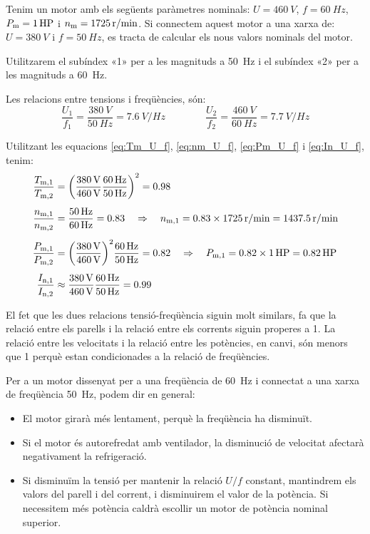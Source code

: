 \begin{exemple}[\MotorVarParamTensFreq{}]
	\addcontentsxms{\MotorVarParamTensFreq}
	Tenim un motor amb els següents paràmetres nominals: $U=\qty{460}{V}$, $f=\qty{60}{Hz}$,  $P_\mathrm{m}=\qty{1}{HP}$ i $n_\mathrm{m}=\qty{1725}{r/min}$. Si connectem aquest motor a una xarxa de: $U=\qty{380}{V}$ i $f=\qty{50}{Hz}$, es tracta de calcular els nous valors nominals del motor.
	
	Utilitzarem el subíndex «1» per a les magnituds  a \qty{50}{Hz} i el  subíndex «2» per a les magnituds a \qty{60}{Hz}.
	
	Les relacions entre tensions i freqüències,  són:
	\[
		\frac{U_1}{f_1} = \frac{\qty{380}{V}}{\qty{50}{Hz}} = \qty{7,6}{V/Hz} \qquad \qquad
		\frac{U_2}{f_2} = \frac{\qty{460}{V}}{\qty{60}{Hz}} = \qty{7,7}{V/Hz} 
	\]

	Utilitzant les equacions \eqref{eq:Tm_U_f},  \eqref{eq:nm_U_f}, \eqref{eq:Pm_U_f} i \eqref{eq:In_U_f},  tenim:
	\begin{align*}
		\frac{T_\mathrm{m,1}}{T_\mathrm{m,2}} &= {\left(\frac{\qty{380}{V}}{\qty{460}{V}}\frac{\qty{60}{Hz}}{\qty{50}{Hz}}\right)}^2 = \num{0,98} \\[1ex]
		\frac{n_\mathrm{m,1}}{n_\mathrm{m,2}} &= \frac{\qty{50}{Hz}}{\qty{60}{Hz}} = \num{0,83}  \quad \Rightarrow \quad n_\mathrm{m,1} = \num{0,83} \times \qty{1725}{r/min} = \qty{1437,5}{r/min} \\[1ex]
		\frac{P_\mathrm{m,1}}{P_\mathrm{m,2}} &= {\left(\frac{\qty{380}{V}}{\qty{460}{V}}\right)}^{2} \frac{\qty{60}{Hz}}{\qty{50}{Hz}} = \num{0,82} \quad \Rightarrow \quad P_\mathrm{m,1} = \num{0,82} \times \qty{1}{HP} = \qty{0,82}{HP}\\[1ex]
		\frac{I_\mathrm{n,1}}{I_\mathrm{n,2}} &\approx
		\frac{\qty{380}{V}}{\qty{460}{V}} \frac{\qty{60}{Hz}}{\qty{50}{Hz}} = \num{0,99}
	\end{align*}

	El fet que les dues relacions tensió-freqüència siguin molt similars, fa que la relació entre els parells i la relació entre els corrents siguin properes a 1. La relació entre les velocitats i la relació entre les potències, en canvi, són menors que 1 perquè estan condicionades a la relació de freqüències. 
\end{exemple}


Per a un motor dissenyat per a una freqüència de \qty{60}{Hz} i connectat a una xarxa de freqüència \qty{50}{Hz}, podem dir en general:
\begin{itemize}
	\item El motor girarà més lentament, perquè la freqüència ha disminuït.
	\item Si el motor és autorefredat amb ventilador, la disminució de velocitat afectarà negativament  la refrigeració.
	\item Si disminuïm la tensió  per mantenir la relació $U/f$ constant, mantindrem els valors del parell i del corrent, i disminuirem el valor de la potència. Si necessitem més potència caldrà escollir un motor de potència nominal superior.
\end{itemize}

